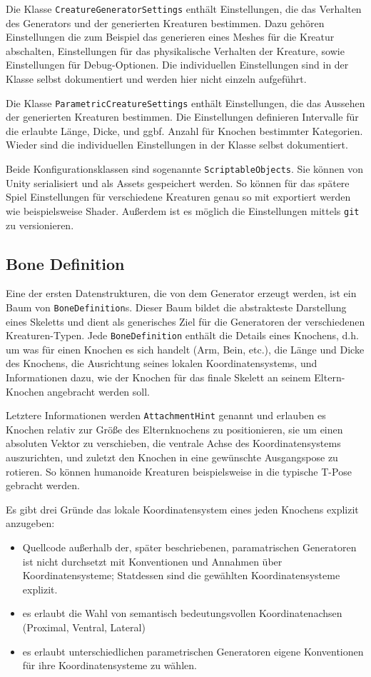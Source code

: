 Die Klasse \texttt{CreatureGeneratorSettings} enthält Einstellungen, die das Verhalten des Generators und der generierten Kreaturen bestimmen.
Dazu gehören Einstellungen die zum Beispiel das generieren eines Meshes für die Kreatur abschalten, Einstellungen für das physikalische Verhalten der Kreature, sowie Einstellungen für Debug-Optionen.
Die individuellen Einstellungen sind in der Klasse selbst dokumentiert und werden hier nicht einzeln aufgeführt.

Die Klasse \texttt{ParametricCreatureSettings} enthält Einstellungen, die das Aussehen der generierten Kreaturen bestimmen.
Die Einstellungen definieren Intervalle für die erlaubte Länge, Dicke, und ggbf. Anzahl für Knochen bestimmter Kategorien.
Wieder sind die individuellen Einstellungen in der Klasse selbst dokumentiert.

Beide Konfigurationsklassen sind sogenannte \texttt{ScriptableObjects}.
Sie können von Unity serialisiert und als Assets gespeichert werden.
So können für das spätere Spiel Einstellungen für verschiedene Kreaturen genau so mit exportiert werden wie beispielsweise Shader.
Außerdem ist es möglich die Einstellungen mittels \texttt{git} zu versionieren.

\subsection{Bone Definition}
Eine der ersten Datenstrukturen, die von dem Generator erzeugt werden, ist ein Baum von \texttt{BoneDefinition}s.
Dieser Baum bildet die abstrakteste Darstellung eines Skeletts und dient als generisches Ziel für die Generatoren der verschiedenen Kreaturen-Typen.
Jede \texttt{BoneDefinition} enthält die Details eines Knochens, d.h. um was für einen Knochen es sich handelt (Arm, Bein, etc.), die Länge und Dicke des Knochens, die Ausrichtung seines lokalen Koordinatensystems, und Informationen dazu, wie der Knochen für das finale Skelett an seinem Eltern-Knochen angebracht werden soll.

Letztere Informationen werden \texttt{AttachmentHint} genannt und erlauben es Knochen relativ zur Größe des Elternknochens zu positionieren, sie um einen absoluten Vektor zu verschieben, die ventrale Achse des Koordinatensystems auszurichten, und zuletzt den Knochen in eine gewünschte Ausgangspose zu rotieren.
So können humanoide Kreaturen beispielsweise in die typische T-Pose gebracht werden.

Es gibt drei Gründe das lokale Koordinatensystem eines jeden Knochens explizit anzugeben:
\begin{itemize}
    \item Quellcode außerhalb der, später beschriebenen, paramatrischen Generatoren ist nicht durchsetzt mit Konventionen und Annahmen über Koordinatensysteme; Statdessen sind die gewählten Koordinatensysteme explizit.
    \item es erlaubt die Wahl von semantisch bedeutungsvollen Koordinatenachsen (Proximal, Ventral, Lateral)
    \item es erlaubt unterschiedlichen parametrischen Generatoren eigene Konventionen für ihre Koordinatensysteme zu wählen.
\end{itemize}

